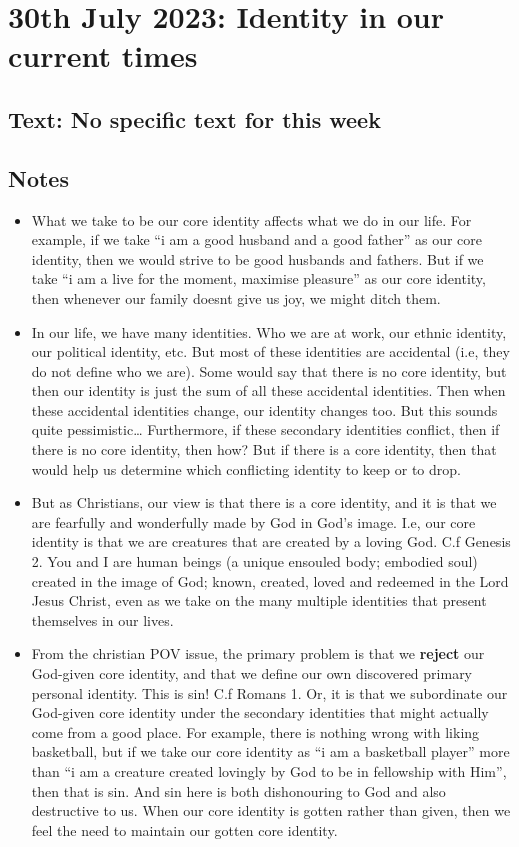 \setcounter{figure}{0}

\section{30th July 2023: Identity in our current times}
\subsection*{Text: No specific text for this week}
\subsection*{Notes}
\begin{itemize}
  \item{What we take to be our core identity affects what we do in our life. For example, if we take “i am a good husband and a good father” as our core identity, then we would strive to be good husbands and fathers. But if we take “i am a live for the moment, maximise pleasure” as our core identity, then whenever our family doesnt give us joy, we might ditch them.}
  \item{In our life, we have many identities. Who we are at work, our ethnic identity, our political identity, etc. But most of these identities are accidental (i.e, they do not define who we are). Some would say that there is no core identity, but then our identity is just the sum of all these accidental identities. Then when these accidental identities change, our identity changes too. But this sounds quite pessimistic… Furthermore, if these secondary identities conflict, then if there is no core identity, then how? But if there is a core identity, then that would help us determine which conflicting identity to keep or to drop.}
  \item{But as Christians, our view is that there is a core identity, and it is that we are fearfully and wonderfully made by God in God’s image. I.e, our core identity is that we are creatures that are created by a loving God. C.f Genesis 2. You and I are human beings (a unique ensouled body; embodied soul) created in the image of God; known, created, loved and redeemed in the Lord Jesus Christ, even as we take on the many multiple identities that present themselves in our lives.}
  \item{From the christian POV issue, the primary problem is that we \textbf{reject} our God-given core identity, and that we define our own discovered primary personal identity. This is sin! C.f Romans 1. Or, it is that we subordinate our God-given core identity under the secondary identities that might actually come from a good place. For example, there is nothing wrong with liking basketball, but if we take our core identity as “i am a basketball player” more than “i am a creature created lovingly by God to be in fellowship with Him”, then that is sin. And sin here is both dishonouring to God and also destructive to us. When our core identity is gotten rather than given, then we feel the need to maintain our gotten core identity.}

\end{itemize}
